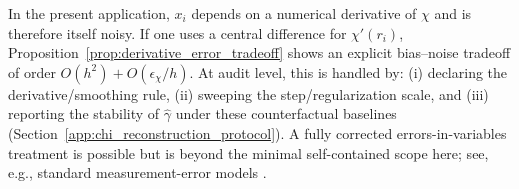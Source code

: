 \begin{remark}\label{rem:wls_errors_in_variables}
In the present application, $x_i$ depends on a numerical derivative of $\chi$ and is therefore itself noisy.
If one uses a central difference for $\chi'(r_i)$, Proposition~\ref{prop:derivative_error_tradeoff} shows an explicit bias--noise tradeoff of order $O(h^2)+O(\epsilon_\chi/h)$.
At audit level, this is handled by: (i) declaring the derivative/smoothing rule, (ii) sweeping the step/regularization scale, and (iii) reporting the stability of $\widehat\gamma$ under these counterfactual baselines (Section~\ref{app:chi_reconstruction_protocol}).
A fully corrected errors-in-variables treatment is possible but is beyond the minimal self-contained scope here; see, e.g., standard measurement-error models \cite{Fuller1987,Carroll2006}.
\end{remark}


